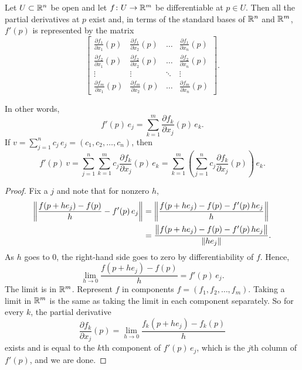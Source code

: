 \begin{prop} \label{mv:prop:jacobianmatrix}
Let $U \subset {\mathbb{R}}^n$ be open and let $f \colon U \to {\mathbb{R}}^m$ be
differentiable at $p \in U$.  Then all the partial derivatives at $p$
exist and, in terms of the standard bases of ${\mathbb{R}}^n$ and ${\mathbb{R}}^m$,
$f'(p)$ is represented by the matrix
\begin{equation*}
\begin{bmatrix}
\frac{\partial f_1}{\partial x_1}(p)
&
\frac{\partial f_1}{\partial x_2}(p)
& \ldots &
\frac{\partial f_1}{\partial x_n}(p)
\\[6pt]
\frac{\partial f_2}{\partial x_1}(p)
&
\frac{\partial f_2}{\partial x_2}(p)
& \ldots &
\frac{\partial f_2}{\partial x_n}(p)
\\
\vdots & \vdots & \ddots & \vdots
\\
\frac{\partial f_m}{\partial x_1}(p)
&
\frac{\partial f_m}{\partial x_2}(p)
& \ldots &
\frac{\partial f_m}{\partial x_n}(p)
\end{bmatrix} .
\end{equation*}
\end{prop}


In other words,
\begin{equation*}
f'(p) \, e_j =
\sum_{k=1}^m
\frac{\partial f_k}{\partial x_j}(p) \,e_k .
\end{equation*}
If $v = \sum_{j=1}^n c_j\, e_j = (c_1,c_2,\ldots,c_n)$, then
\begin{equation*}
f'(p) \, v =
\sum_{j=1}^n
\sum_{k=1}^m
 c_j
\frac{\partial f_k}{\partial x_j}(p) \,e_k
=
\sum_{k=1}^m
\left(
\sum_{j=1}^n
 c_j
\frac{\partial f_k}{\partial x_j}(p) \right) \,e_k .
\end{equation*}

\begin{proof}
Fix a $j$ and note that for nonzero $h$,
\begin{equation*}
\begin{split}
\left\lVert {\frac{f(p+h e_j)-f(p)}{h} - f'(p) \, e_j} \right\rVert & = 
\left\lVert {\frac{f(p+h e_j)-f(p) - f'(p) \, h e_j}{h}} \right\rVert \\
& =
\frac{\bigl\lVert {f(p+h e_j)-f(p) - f'(p) \, h e_j} \bigr\rVert}{\lVert {h e_j} \rVert} .
\end{split}
\end{equation*}
As $h$ goes to 0, the right-hand side goes to zero by
differentiability of $f$.  Hence,
\begin{equation*}
\lim_{h \to 0}
\frac{f(p+h e_j)-f(p)}{h} = f'(p) \, e_j  .
\end{equation*}
The limit is in ${\mathbb{R}}^m$.
Represent $f$ in components
$f = (f_1,f_2,\ldots,f_m)$.
Taking a limit in ${\mathbb{R}}^m$
is the same as taking the limit in each component separately.  
So for every $k$,
the partial derivative
\begin{equation*}
\frac{\partial f_k}{\partial x_j} (p)
=
\lim_{h \to 0}
\frac{f_k(p+h e_j)-f_k(p)}{h}
\end{equation*}
exists and is equal to the $k$th component of $f'(p)\, e_j$, which is the
$j$th column of $f'(p)$,
and we are done.
\end{proof}


